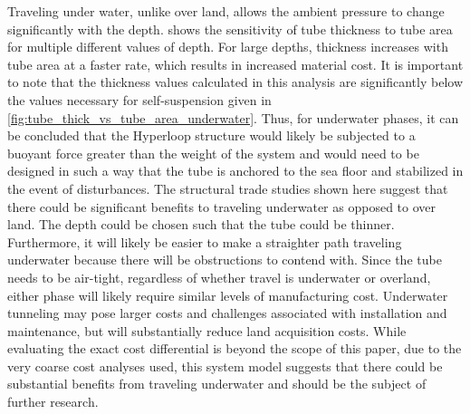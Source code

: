 Traveling under water, unlike over land, allows the ambient pressure to change
significantly with the depth. 
shows the sensitivity of tube thickness to tube area for multiple different values of depth.
For large depths, thickness increases with tube area at a faster rate, which
results in increased material cost. It is important to note that the thickness
values calculated in this analysis are significantly below the values necessary
for self-suspension given in \cref{fig:tube_thick_vs_tube_area_underwater}. Thus, for
underwater phases, it can be concluded that the Hyperloop structure would
likely be subjected to a buoyant force greater than the weight of the system
and would need to be designed in such a way that the tube is anchored to the sea
floor and stabilized in the event of disturbances.
The structural trade studies shown here suggest that there could be significant
benefits to traveling underwater as opposed to over land. The depth could be
chosen such that the tube could be thinner. Furthermore, it will likely be
easier to make a straighter path traveling underwater because there will be
obstructions to contend with. Since the tube needs to be
air-tight, regardless of whether travel is underwater or overland, either phase
will likely require similar levels of manufacturing cost. Underwater tunneling
may pose larger costs and challenges associated with installation and maintenance,
but will substantially reduce land acquisition costs. While evaluating the
exact cost differential is beyond the scope of this paper, due to the very coarse cost analyses used, this system model suggests that
there could be substantial benefits from traveling underwater and should be the subject of further research.
